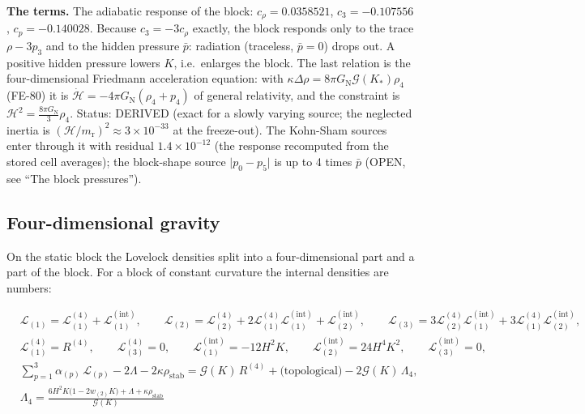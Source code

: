 \documentclass[
  10pt,
]{article}
\begin{document}
\textbf{The terms.} The adiabatic response of the block:
\(c_\rho = 0.0358521\), \(c_3 = -0.107556\), \(c_p = -0.140028\).
Because \(c_3 = -3c_\rho\) exactly, the block responds only to the trace
\(\rho - 3p_3\) and to the hidden pressure \(\bar p\): radiation
(traceless, \(\bar p = 0\)) drops out. A positive hidden pressure lowers
\(K\), i.e.~enlarges the block. The last relation is the
four-dimensional Friedmann acceleration equation: with
\(\kappa\Delta\rho = 8\pi G_{\mathrm{N}}\mathcal{G}(K_*)\rho_4\) (FE-80)
it is \(\dot{\mathcal{H}} = -4\pi G_{\mathrm{N}}(\rho_4 + p_4)\) of
general relativity, and the constraint is
\(\mathcal{H}^2 = \frac{8\pi G_{\mathrm{N}}}{3}\rho_4\). Status: DERIVED
(exact for a slowly varying source; the neglected inertia is
\((\mathcal{H}/m_{\mathrm{r}})^2 \approx 3\times10^{-33}\) at the
freeze-out). The Kohn-Sham sources enter through it with residual
\(1.4\times10^{-12}\) (the response recomputed from the stored cell
averages); the block-shape source \(\lvert p_0 - p_5\rvert\) is up to 4
times \(\bar p\) (OPEN, see ``The block pressures'').

\hypertarget{four-dimensional-gravity}{%
\subsection{Four-dimensional gravity}\label{four-dimensional-gravity}}

On the static block the Lovelock densities split into a four-dimensional
part and a part of the block. For a block of constant curvature the
internal densities are numbers:

\[
\begin{aligned}
&\mathcal{L}_{(1)} = \mathcal{L}^{(4)}_{(1)} + \mathcal{L}^{(\mathrm{int})}_{(1)},\qquad
 \mathcal{L}_{(2)} = \mathcal{L}^{(4)}_{(2)} + 2\mathcal{L}^{(4)}_{(1)}\mathcal{L}^{(\mathrm{int})}_{(1)}
 + \mathcal{L}^{(\mathrm{int})}_{(2)},\qquad
 \mathcal{L}_{(3)} = 3\mathcal{L}^{(4)}_{(2)}\mathcal{L}^{(\mathrm{int})}_{(1)} +
 3\mathcal{L}^{(4)}_{(1)}\mathcal{L}^{(\mathrm{int})}_{(2)},\\
&\mathcal{L}^{(4)}_{(1)} = R^{(4)},\qquad \mathcal{L}^{(4)}_{(3)} = 0,\qquad
 \mathcal{L}^{(\mathrm{int})}_{(1)} = -12H^2K,\qquad
 \mathcal{L}^{(\mathrm{int})}_{(2)} = 24H^4K^2,\qquad \mathcal{L}^{(\mathrm{int})}_{(3)} = 0,\\
&\sum_{p=1}^{3}\alpha_{(p)}\,\mathcal{L}_{(p)} - 2\Lambda - 2\kappa\rho_{\mathrm{stab}}
 = \mathcal{G}(K)\,R^{(4)} + \text{(topological)} - 2\mathcal{G}(K)\,\Lambda_4,\\
&\Lambda_4 = \frac{6H^2K\big(1 - 2w_{(2)}K\big) + \Lambda + \kappa\rho_{\mathrm{stab}}}{\mathcal{G}(K)}
\end{aligned} \tag{FE-48}
\]
\end{document}
